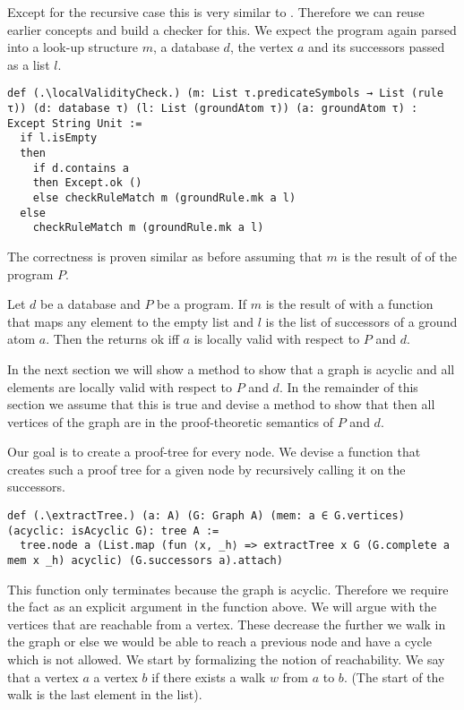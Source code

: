 Except for the recursive case this is very similar to \isValid. Therefore we can reuse earlier concepts and build a checker for this. We expect the program again parsed into a look-up structure $m$, a database $d$, the vertex $a$ and its successors passed as a list $l$.

\begin{lstlisting}
def (.\localValidityCheck.) (m: List τ.predicateSymbols → List (rule τ)) (d: database τ) (l: List (groundAtom τ)) (a: groundAtom τ) : Except String Unit :=
  if l.isEmpty
  then
    if d.contains a
    then Except.ok ()
    else checkRuleMatch m (groundRule.mk a l)
  else
    checkRuleMatch m (groundRule.mk a l)
\end{lstlisting}

The correctness is proven similar as before assuming that $m$ is the result of \parseProgramToSymbolSequenceMap of the program $P$.

\begin{lemma}[\localValidityCheckUnitIffLocallyValid]
    Let $d$ be a database and $P$ be a program. If $m$ is the result of \parseProgramToSymbolSequenceMap with a function that maps any element to the empty list and $l$ is the list of successors of a ground atom $a$. Then the \localValidityCheck returns ok iff $a$ is locally valid with respect to $P$ and $d$.
\end{lemma}

In the next section we will show a method to show that a graph is acyclic and all elements are locally valid with respect to $P$ and $d$. In the remainder of this section we assume that this is true and devise a method to show that then all vertices of the graph are in the proof-theoretic semantics of $P$ and $d$.

Our goal is to create a proof-tree for every node. We devise a function that creates such a proof tree for a given node by recursively calling it on the successors.

\begin{lstlisting}
def (.\extractTree.) (a: A) (G: Graph A) (mem: a ∈ G.vertices) (acyclic: isAcyclic G): tree A :=
  tree.node a (List.map (fun ⟨x, _h⟩ => extractTree x G (G.complete a mem x _h) acyclic) (G.successors a).attach)
\end{lstlisting}

This function only terminates because the graph is acyclic. Therefore we require the fact as an explicit argument in the function above. We will argue with the vertices that are reachable from a vertex. These decrease the further we walk in the graph or else we would be able to reach a previous node and have a cycle which is not allowed. We start by formalizing the notion of reachability. We say that a vertex $a$ \canReach a vertex $b$ if there exists a walk $w$ from $a$ to $b$. (The start of the walk is the last element in the list).


